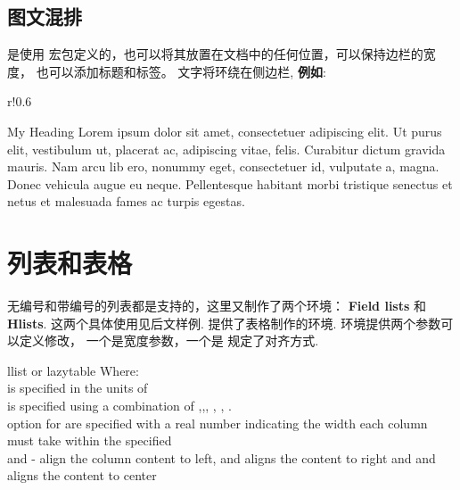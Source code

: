 \documentclass[12pt,a4paper]{report}
\begin{document}
\subsection{图文混排}
  是使用  宏包定义的，也可以将其放置在文档中的任何位置，可以保持边栏的宽度， 也可以添加标题和标签。 文字将环绕在侧边栏, \textbf{例如}:\\

\lipsum[1]
\begin{wrapfigure}{r!}{0.6\textwidth}
	\begin{sidebar}{My Heading}
		Lorem ipsum dolor sit amet, consectetuer adipiscing elit. Ut purus elit, vestibulum ut, placerat ac, adipiscing vitae, felis. Curabitur dictum gravida mauris. Nam arcu lib ero, nonummy eget, consectetuer id, vulputate a, magna. Donec vehicula augue eu neque. Pellentesque habitant morbi tristique senectus et netus et malesuada fames ac turpis egestas.
	\end{sidebar}
\end{wrapfigure}
\lipsum[2]

\section{列表和表格}
\label{listntables}
无编号和带编号的列表都是支持的，这里又制作了两个环境：  \textbf{Field lists} 和 \textbf{Hlists}. 这两个具体使用见后文样例.  提供了表格制作的环境. 环境提供两个参数可以定义修改， 一个是宽度参数，一个是  规定了对齐方式.\\
\begin{tip}[Command]
\begin{docEnvironment}%
	[doclang/environment content=content]%
	{llist or lazytable}{}
	Where:\\
	 is specified in the units of \\
	\noindent	
 	 is specified using a combination of ,,, , , .\\
 	\noindent
	 option for  are specified with a real number indicating the width each column must take within the specified \\
	\noindent
	 and  - align the column content to left,  and  aligns the content to right and  and  aligns the content to center
\end{docEnvironment}
\end{tip}
	
\end{document}
